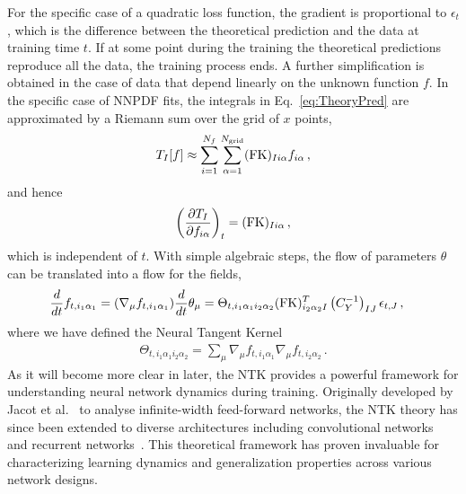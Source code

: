 For the specific case of a quadratic loss function, the gradient is proportional
to $\epsilon_t$, which is the difference between the theoretical prediction and
the data at training time $t$. If at some point during the training the
theoretical predictions reproduce all the data, the training process ends. A
further simplification is obtained in the case of data that depend linearly on
the unknown function $f$. In the specific case of NNPDF fits, the integrals in
Eq.~\eqref{eq:TheoryPred} are approximated by a Riemann sum over the grid of $x$
points,
\begin{align}
    \label{eq:FKTabDef}
    T_I[f] \approx \sum_{i=1}^{N_{f}}\sum_{\alpha=1}^{N_{\mathrm{grid}}} (\mathrm{FK})_{Ii\alpha} f_{i\alpha}\, ,
\end{align}
and hence
\begin{align}
    \label{eq:dTbydf}
    \left(\frac{\partial T_I}{\partial f_{i\alpha}}\right)_t =
        (\mathrm{FK})_{Ii\alpha}\, ,
\end{align}
which is independent of $t$. With simple algebraic steps, the flow of parameters
$\theta$ can be translated into a flow for the fields,
\begin{align}
    \label{eq:NTKFlow}
    \frac{d}{dt} &f_{t,i_1\alpha_1} = (\nabla_\mu f_{t,i_1\alpha_1}) \frac{d}{dt} \theta_\mu =
      \Theta_{t,i_1\alpha_1i_2\alpha_2}
      (\mathrm{FK})^T_{i_2\alpha_2I} \left(C_Y^{-1}\right)_{IJ} \epsilon_{t,J}\, ,
\end{align}
where we have defined the Neural Tangent Kernel~\cite{jacot2018neural}
\begin{align}
    \label{eq:NTKDef}
    \Theta_{t,i_1\alpha_1i_2\alpha_2} = \sum_\mu
    \nabla_\mu f_{t,i_1\alpha_1} \nabla_\mu f_{t,i_2\alpha_2}\, .
\end{align}
As it will become more clear in later, the NTK provides a powerful framework for
understanding neural network dynamics during training. Originally developed by
Jacot et al.~\cite{jacot2018neural} to analyse infinite-width feed-forward
networks, the NTK theory has since been extended to diverse architectures
including convolutional networks~\cite{arora2019exact} and recurrent
networks~\cite{alemohammad2021recurrent}. This theoretical framework has proven
invaluable for characterizing learning dynamics and generalization properties
across various network designs. 

